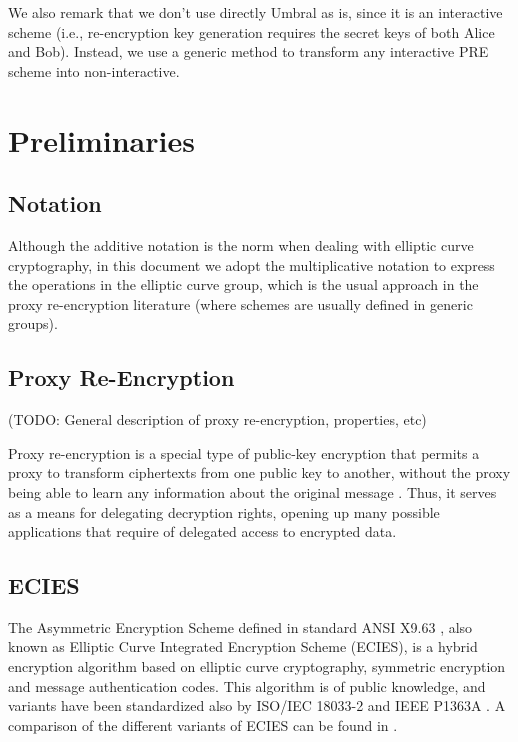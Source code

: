 \documentclass{amsart}
\begin{document}
We also remark that we don't use directly Umbral as is, since it is an interactive scheme (i.e., re-encryption key generation requires the secret keys of both Alice and Bob). 
Instead, we use a generic method to transform any interactive PRE scheme into non-interactive. 

\section{Preliminaries}

\subsection{Notation}

Although the additive notation is the norm when dealing with elliptic curve cryptography, in this document we adopt the multiplicative notation to express the operations in the elliptic curve group, which is the usual approach in the proxy re-encryption literature (where schemes are usually defined in generic groups).

\subsection{Proxy Re-Encryption}

(TODO: General description of proxy re-encryption, properties, etc)

Proxy re-encryption is a special type of public-key encryption that permits a proxy to transform ciphertexts from one public key to another, without the proxy being able to learn any information about the original message \cite{nunez2017proxy}. 
Thus, it serves as a means for delegating decryption rights, opening up many possible applications that require of delegated access to encrypted data. 



\subsection{ECIES}

The Asymmetric Encryption Scheme defined in standard ANSI X9.63 \cite{ansi-x9.63}, also known as Elliptic Curve Integrated Encryption Scheme (ECIES), is a hybrid encryption algorithm based on elliptic curve cryptography, symmetric encryption and message authentication codes. 
This algorithm is of public knowledge, and variants have been standardized also by ISO/IEC 18033-2 \cite{iso-18033-2} and IEEE P1363A \cite{ieee-p1363a}. A comparison of the different variants of ECIES can be found in \cite{gayoso2015security}. 
\end{document}
